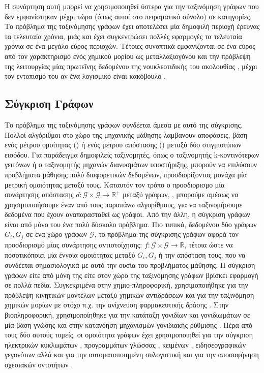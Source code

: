 Η συνάρτηση αυτή μπορεί να χρησιμοποιηθεί ύστερα για την ταξινόμηση γράφων που δεν εμφανίστηκαν μέχρι τώρα (όπως αυτοί στο πειραματικό σύνολο) σε κατηγορίες.
Το πρόβλημα της ταξινόμησης γράφων έχει αποτελέσει μία δημοφιλή περιοχή έρευνας τα τελευταία χρόνια, μιάς και έχει συγκεντρώσει πολλές εφαρμογές τα τελευταία χρόνια σε ένα μεγάλο εύρος περιοχών.
Τέτοιες συνοπτικά εμφανίζονται σε ένα εύρος από τον χαρακτηρισμό ενός χημικού μορίου ως μεταλλαξιογόνου \cite{Swamidass2005} και την πρόβλεψη της λειτουργίας μίας πρωτεΐνης δεδομένου της νουκλεοτιδικής του ακολουθίας \cite{Borgwardt2005}, μέχρι τον εντοπισμό του αν ένα λογισμικό είναι κακόβουλο \cite{Wagner2009}.
\subsection{Σύγκριση Γράφων}
Το πρόβλημα της ταξινόμησης γράφων συνδέεται άμεσα με αυτό της σύγκρισης.
Πολλοί αλγόριθμοι στο χώρο της μηχανικής μάθησης λαμβανουν αποφάσεις, βάση ενός μέτρου ομοίτητας () ή ενός μέτρου απόστασης () μεταξύ δύο στιγμιοτύπων εισόδου.
Για παράδειγμα δημοφιλείς ταξινομητές, όπως ο ταξινομητής k-κοντινότερων γειτόνων ή ο ταξινομητής μηχανών διανυσμάτων υποστήριξης, μπορούν να επιλύσουν προβλήματα μάθησης πολύ διαφορετικών δεδομένων, προσδιορίζοντας μονάχα μία μετρική ομοιότητας μεταξύ τους.
Καταυτόν τον τρόπο ο προσδιορισμο μία συνάρτησης απόστασης $d : \mathcal{G} \times \mathcal{G} \rightarrow \mathbb{R}^{+}$ μεταξύ γράφων, , μπορούμε αμέσως να χρησιμοποιήσουμε έναν από τους παραπάνω αλγορίθμους, για να ταξινομήσουμε δεδομένα που έχουν αναπαρασταθεί ως γράφοι.
Από την άλλη, η σύγκριση γράφων είναι από μόνο του ένα πολύ δύσκολο πρόβλημα. Πιο τυπικά, δεδομένου δύο γράφων $G_{i}, G_{j}$ σε ένα χώρο γράφων $\mathcal{G}$, το πρόβλημα της σύγκρισης γράφων αφορά τον προσδιορισμό μίας συνάρτησης αντιστοίχησης: $f: \mathcal{G} \times \mathcal{G} \rightarrow \mathbb{R}$, τέτοια ώστε να ποσοτικόποιεί μία έννοια ομοιότητας μεταξύ $G_{i}, G_{j}$ ή την απόσταση τους, που να συνδέεται σημασιολογικά με αυτό την ουσία του προβλήματος μάθησης.
Η σύγκριση γράφων είτε από μόνη της είτε στον χώρο της ταξινόμησης γράφων βρίσκει εφαρμογή σε πολλά πεδία.
Συγκεκριμένα στην χημιο-πληροφορική, χρησιμοποιήθηκε για την πρόβλεψη κινητικών μοντέλων μεταξύ χημικών αντιδράσεων \cite{Genesys} και για την ταξινόμηση χημικών μορίων με στόχο π.χ. την ανίχνευση φαρμακευτικής δράσης \cite{Wale2008}.
Στην βιοπληροφορική, χρησιμοποίηθηκε για την κατάταξη γονιδίων και γονιδιωμάτων σε μία βάση γνώσης\cite{KEGG, Hattori2003} και 
στην κατανόηση μηχανισμών γονιδιακής ρύθμισης \cite{Davidson1669}.
Πέρα από τους δύο αυτούς τομείς, οι ομοιότητα γράφων έχει χρησιμοποιηθεί για την σύγκριση ηλεκτρικών κυκλωμάτων \cite{Takashima1988}, προγραμμάτων γλώσσας  \cite{Gitchell1999}, κειμένων \cite{Rousseau2015TextCA}, ειδησεογραφικών γεγονότων \cite{Glavas2013} αλλά και για την αυτοματοποιημένη συλογιστική \cite{Tsivtsivadze2011} και για την αποσαφήνηση σχεσιακών οντοτήτων \cite{Hermansson2013EntityDI}.
